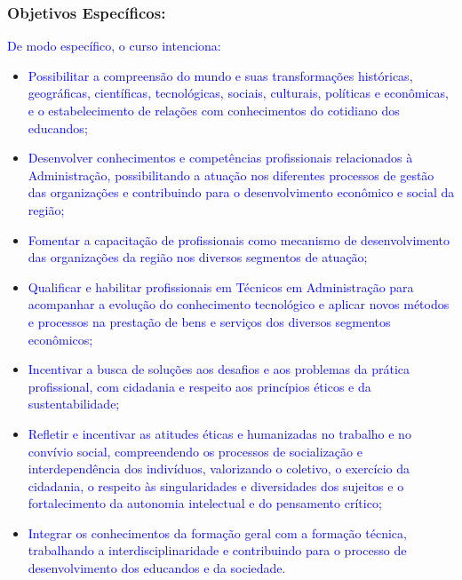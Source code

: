 \documentclass{../../modelos/latex-shared/ifsc-ppc}
\newcommand{\revisao}[1]{\textcolor{blue}{#1}}
\newcommand{\revisao}[1]{#1}
\newcommand{\semsumario}[1]{\addtocontents{toc}{\protect\setcounter{tocdepth}{2}}#1\addtocontents{toc}{\protect\setcounter{tocdepth}{4}}}
\begin{document}
\semsumario{\subsubsection{Objetivos Específicos:}}
\revisao{De modo específico, o curso intenciona:}
\begin{itemize}
    \item \revisao{Possibilitar a compreensão do mundo e suas transformações históricas, geográficas, científicas, tecnológicas, sociais, culturais, políticas e econômicas, e o estabelecimento de relações com conhecimentos do cotidiano dos educandos;}
    \item \revisao{Desenvolver conhecimentos e competências profissionais relacionados à Administração, possibilitando a atuação nos diferentes processos de gestão das organizações e contribuindo para o desenvolvimento econômico e social da região;}
    \item \revisao{Fomentar a capacitação de profissionais como mecanismo de desenvolvimento das organizações da região nos diversos segmentos de atuação;}
    \item \revisao{Qualificar e habilitar profissionais em Técnicos em Administração para acompanhar a evolução do conhecimento tecnológico e aplicar novos métodos e processos na prestação de bens e serviços dos diversos segmentos econômicos;}
    \item \revisao{Incentivar a busca de soluções aos desafios e aos problemas da prática profissional, com cidadania e respeito aos princípios éticos e da sustentabilidade;}
    \item \revisao{Refletir e incentivar as atitudes éticas e humanizadas no trabalho e no convívio social, compreendendo os processos de socialização e interdependência dos indivíduos, valorizando o coletivo, o exercício da cidadania, o respeito às singularidades e diversidades dos sujeitos e o fortalecimento da autonomia intelectual e do pensamento crítico;}
    \item \revisao{Integrar os conhecimentos da formação geral com a formação técnica, trabalhando a interdisciplinaridade e contribuindo para o processo de desenvolvimento dos educandos e da sociedade.}
\end{itemize}
\end{document}
